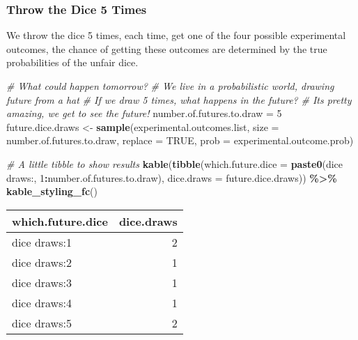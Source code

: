 \documentclass[
]{book}
\newenvironment{Shaded}{\begin{snugshade}}{\end{snugshade}}
\newcommand{\CommentTok}[1]{\textcolor[rgb]{0.56,0.35,0.01}{\textit{#1}}}
\newcommand{\DataTypeTok}[1]{\textcolor[rgb]{0.13,0.29,0.53}{#1}}
\newcommand{\DecValTok}[1]{\textcolor[rgb]{0.00,0.00,0.81}{#1}}
\newcommand{\KeywordTok}[1]{\textcolor[rgb]{0.13,0.29,0.53}{\textbf{#1}}}
\newcommand{\NormalTok}[1]{#1}
\newcommand{\OperatorTok}[1]{\textcolor[rgb]{0.81,0.36,0.00}{\textbf{#1}}}
\newcommand{\OtherTok}[1]{\textcolor[rgb]{0.56,0.35,0.01}{#1}}
\newcommand{\StringTok}[1]{\textcolor[rgb]{0.31,0.60,0.02}{#1}}
\begin{document}
\hypertarget{throw-the-dice-5-times}{%
\subsubsection{Throw the Dice 5 Times}\label{throw-the-dice-5-times}}

We throw the dice 5 times, each time, get one of the four possible experimental outcomes, the chance of getting these outcomes are determined by the true probabilities of the unfair dice.

\begin{Shaded}
\begin{Highlighting}[]
\CommentTok{\# What could happen tomorrow?}
\CommentTok{\# We live in a probabilistic world, drawing future from a hat}
\CommentTok{\# If we draw 5 times, what happens in the future?}
\CommentTok{\# It\textquotesingle{}s pretty amazing, we get to see the future!}
\NormalTok{number.of.futures.to.draw =}\StringTok{ }\DecValTok{5}
\NormalTok{future.dice.draws \textless{}{-}}\StringTok{ }\KeywordTok{sample}\NormalTok{(experimental.outcomes.list,}
                                 \DataTypeTok{size =}\NormalTok{ number.of.futures.to.draw,}
                                 \DataTypeTok{replace =} \OtherTok{TRUE}\NormalTok{,}
                                 \DataTypeTok{prob =}\NormalTok{ experimental.outcome.prob)}

\CommentTok{\# A little tibble to show results}
\KeywordTok{kable}\NormalTok{(}\KeywordTok{tibble}\NormalTok{(}\DataTypeTok{which.future.dice =} \KeywordTok{paste0}\NormalTok{(}\StringTok{\textquotesingle{}dice draws:\textquotesingle{}}\NormalTok{, }\DecValTok{1}\OperatorTok{:}\NormalTok{number.of.futures.to.draw),}
       \DataTypeTok{dice.draws =}\NormalTok{ future.dice.draws)) }\OperatorTok{\%\textgreater{}\%}\StringTok{ }\KeywordTok{kable\_styling\_fc}\NormalTok{()}
\end{Highlighting}
\end{Shaded}

\begin{table}[!h]
\centering
\begin{tabular}{l|r}
\hline
which.future.dice & dice.draws\\
\hline
\rowcolor{gray!6}  dice draws:1 & 2\\
\hline
dice draws:2 & 1\\
\hline
\rowcolor{gray!6}  dice draws:3 & 1\\
\hline
dice draws:4 & 1\\
\hline
\rowcolor{gray!6}  dice draws:5 & 2\\
\hline
\end{tabular}
\end{table}
\end{document}
